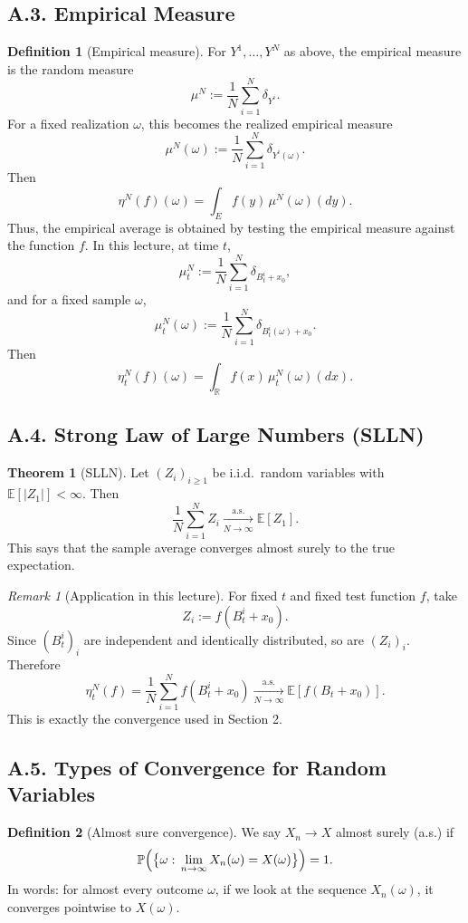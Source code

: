 \documentclass[11pt]{article}
\theoremstyle{definition}
\newtheorem{definition}{Definition}
\newtheorem{theorem}{Theorem}
\theoremstyle{remark}
\newtheorem{remark}{Remark}
\begin{document}
\subsection*{A.3. Empirical Measure}
\begin{definition}[Empirical measure]
For $Y^1,\dots,Y^N$ as above, the empirical measure is the random measure
\[
\mu^N:=\frac{1}{N}\sum_{i=1}^N \delta_{Y^i}.
\]
For a fixed realization $\omega$, this becomes the realized empirical measure
\[
\mu^N(\omega):=\frac{1}{N}\sum_{i=1}^N \delta_{Y^i(\omega)}.
\]
Then
\[
\eta^N(f)(\omega)=\int_E f(y)\,\mu^N(\omega)(dy).
\]
Thus, the empirical average is obtained by testing the empirical measure against the function $f$. In this lecture, at time $t$,
\[
\mu_t^N:=\frac{1}{N}\sum_{i=1}^N \delta_{B_t^i+x_0},
\]
and for a fixed sample $\omega$,
\[
\mu_t^N(\omega):=\frac{1}{N}\sum_{i=1}^N \delta_{B_t^i(\omega)+x_0}.
\]
Then
\[
\eta_t^N(f)(\omega)=\int_{\mathbb R} f(x)\,\mu_t^N(\omega)(dx).
\]
\end{definition}

\subsection*{A.4. Strong Law of Large Numbers (SLLN)}
\begin{theorem}[SLLN]
Let $(Z_i)_{i\ge1}$ be i.i.d.\ random variables with $\mathbb E[|Z_1|]<\infty$. Then
\[
\frac{1}{N}\sum_{i=1}^N Z_i
\xrightarrow[N\to\infty]{\text{a.s.}}
\mathbb E[Z_1].
\]
This says that the sample average converges almost surely to the true expectation.
\end{theorem}

\begin{remark}[Application in this lecture]
For fixed $t$ and fixed test function $f$, take
\[
Z_i:=f(B_t^i+x_0).
\]
Since $(B_t^i)_i$ are independent and identically distributed, so are $(Z_i)_i$. Therefore
\[
\eta_t^N(f)
=
\frac{1}{N}\sum_{i=1}^N f(B_t^i+x_0)
\xrightarrow[N\to\infty]{\text{a.s.}}
\mathbb E[f(B_t+x_0)].
\]
This is exactly the convergence used in Section 2.
\end{remark}

\subsection*{A.5. Types of Convergence for Random Variables}
\begin{definition}[Almost sure convergence]
We say $X_n\to X$ almost surely (a.s.) if
\[
\mathbb P\Bigl(\bigl\{\omega:\,\lim_{n\to\infty}X_n(\omega)=X(\omega)\bigr\}\Bigr)=1.
\]
In words: for almost every outcome $\omega$, if we look at the sequence $X_n(\omega)$, it converges pointwise to $X(\omega)$.
\end{definition}
\end{document}
